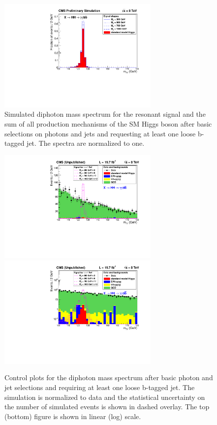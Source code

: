 \begin{figure}[ht]
 \begin{center}
   \includegraphics[width=0.70\textwidth]{figures/objects/DiPhotonMass_OnlyHiggs.pdf}
 \end{center}
\caption{Simulated diphoton mass spectrum for the resonant signal and the sum of all production
mechanisms of the
SM Higgs boson after basic selections on photons and jets and requesting at least
one loose b-tagged jet.
The spectra are normalized to one.}
\label{fig:mgg_onlyhiggs}
\end{figure}

\begin{figure}[ht]
 \begin{center}
   \includegraphics[width=0.70\textwidth]{figures/objects/DiPhotonMass_ShapeNormalized_sys.pdf}
   \includegraphics[width=0.70\textwidth]{figures/objects/DiPhotonMass_ShapeNormalized_Log_sys.pdf}
 \end{center}
\caption{Control plots for the diphoton mass spectrum after basic photon and jet selections
and requiring at least one loose b-tagged jet. The simulation is normalized to data and
the statistical uncertainty on the number of simulated events is shown in dashed overlay.
The top (bottom) figure is shown in linear (log) scale.}
\label{fig:mgg_controlplot}
\end{figure}

